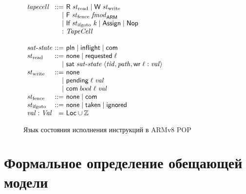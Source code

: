 \begin{figure}
  \begin{center}
$\begin{array}{l @{~} r @{~} l}
\tapeCell & ::= & \tapeRead{\Rstate} \mid \tapeWrite{\Wstate} \\
          & |   & \tapeFence{\Fstate}{\Ftype} \\
          & |   & \tapeIfGoto{\IfState}{\z} \mid \tapeAssign \mid \tapeNop \\
          & :   & \TapeCell \\
\\
\satisfiedState & ::= & \Plain \mid \SatisfiedInFlight \mid \Committed \\
\Rstate & ::= & \None \mid \Issued{\loc} \\
        & |   & \tapeSatisfied{\satisfiedState}{\stRequestWrite{\tId}{\cpath}{\loc}{\stval}} \\
\Wstate   & ::= & \None \\
          & |   & \tapePending{\loc}{\stval} \\
         & |   & \tapeWriteCommitted{bool}{\loc}{\stval}\\
\Fstate  & ::= & \None \mid \Committed\\
\IfState & ::= & \None \mid \Taken \mid \Ignored \; \\
\stval   :  \Stval  &  = & \Loc \cup \mathbb{Z} \\
\end{array}$
  \end{center}
\caption{Язык состояния исполнения инструкций в ARMv8 POP}
\label{fig:tape-arm}
\end{figure}

\section{Формальное определение обещающей модели}
\label{sec:armpop:promisemodel}


